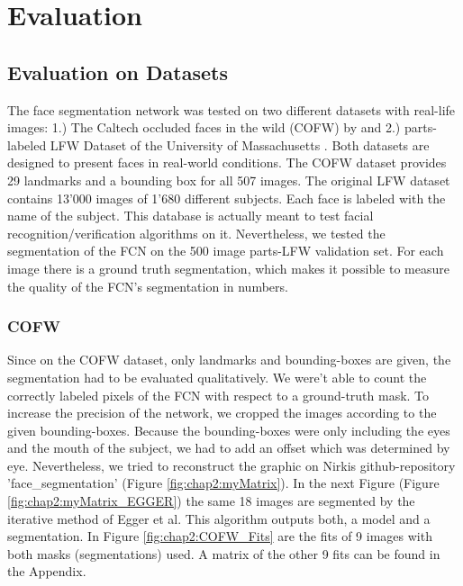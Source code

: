 
\chapter{Evaluation}
\section{Evaluation on Datasets}
\label{sec:EvaluationOnDatasets} %
The face segmentation network was tested on two different datasets with real-life images: 1.) The Caltech occluded faces in the wild (COFW) by \cite{cofw} and 2.) parts-labeled LFW Dataset of the University of Massachusetts \cite{LFW_dataset}. Both datasets are designed to present faces in real-world conditions. The COFW dataset provides 29 landmarks and a bounding box for all 507 images. The original LFW dataset contains 13'000 images of 1'680 different subjects. Each face is labeled with the name of the subject. This database is actually meant to test facial recognition/verification algorithms on it. Nevertheless, we tested the segmentation of the FCN on the 500 image parts-LFW validation set. For each image there is a ground truth segmentation, which makes it possible to measure the quality of the FCN's segmentation in numbers.
\\
\subsection{COFW}
Since on the COFW dataset, only landmarks and bounding-boxes are given, the segmentation had to be evaluated qualitatively. We were't able to count the correctly labeled pixels of the FCN with respect to a ground-truth mask. To increase the precision of the network, we cropped the images according to the given bounding-boxes. Because the bounding-boxes were only including the eyes and the mouth of the subject, we had to add an offset which was determined by eye. Nevertheless, we tried to reconstruct the graphic on Nirkis \cite{nirkin2018_faceswap} github-repository 'face\_segmentation' (Figure \ref{fig:chap2:myMatrix}). In the next Figure (Figure \ref{fig:chap2:myMatrix_EGGER}) the same 18 images are segmented by the iterative method of Egger et al. This algorithm outputs both, a model and a segmentation. In Figure \ref{fig:chap2:COFW_Fits} are the fits of 9 images with both masks (segmentations) used. A matrix of the other 9 fits can be found in the Appendix.

